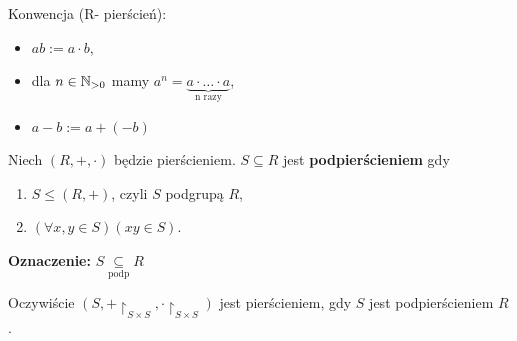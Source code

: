 Konwencja (R- pierścień):
\begin{itemize}
	\item $ab:= a\cdot b$,
	\item dla $n\in \mathbb{N}_{>0}$ mamy $a^{n}=\underbrace{a\cdot \ldots\cdot a}_{\text{n razy}}$,
	\item  $a-b := a+ (-b)$
\end{itemize}
\begin{definition}[Podpierścień.]
	Niech $\left( R,+,\cdot  \right) $ będzie pierścieniem. $S\subseteq R$ jest \textbf{podpierścieniem} gdy
	\begin{enumerate}[label=\arabic*.]
		\item $S\le (R,+)$, czyli $S$ podgrupą  $R$,
		\item  $\left(\forall x,y\in S \right)\left( xy \in S \right)  $.
	\end{enumerate}
	\noindent \textbf{Oznaczenie:} $S \underset{\scriptscriptstyle\text{podp}}{\subseteq}  R$ 
\end{definition} 
\begin{remark}
Oczywiście $(S, +\restriction_{S\times S}, \cdot\restriction_{S\times S})$ jest pierścieniem, gdy $S$ jest podpierścieniem $R$.
\end{remark} 

